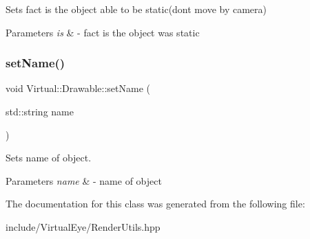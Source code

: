 Sets fact is the object able to be static(don\textquotesingle{}t move by camera) 


\begin{DoxyParams}{Parameters}
{\em is} & -\/ fact is the object was static \\
\hline
\end{DoxyParams}
\hypertarget{class_virtual_1_1_drawable_aef40e51fef6aacd0bc200347671126f0}{}\label{class_virtual_1_1_drawable_aef40e51fef6aacd0bc200347671126f0} 
\subsubsection{\texorpdfstring{set\+Name()}{setName()}}
{\footnotesize\ttfamily void Virtual\+::\+Drawable\+::set\+Name (\begin{DoxyParamCaption}\item[{std\+::string}]{name }\end{DoxyParamCaption})}



Sets name of object. 


\begin{DoxyParams}{Parameters}
{\em name} & -\/ name of object \\
\hline
\end{DoxyParams}


The documentation for this class was generated from the following file\+:\begin{DoxyCompactItemize}
\item 
include/\+Virtual\+Eye/Render\+Utils.\+hpp\end{DoxyCompactItemize}
